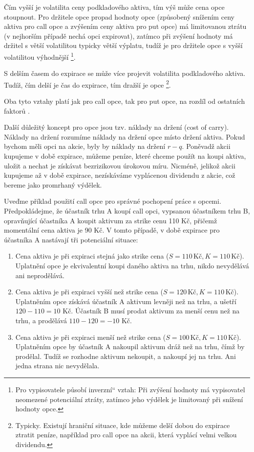 \documentclass[male,czech,api_bc]{kitheses}
\newcommand{\UV}[1]{\quotedblbase#1\textquotedblleft}
\begin{document}
  Čím vyšší je volatilita ceny podkladového aktiva, tím výš může cena opce stoupnout. Pro držitele opce propad hodnoty opce (způsobený snížením ceny aktiva pro call opce a zvýšením ceny aktiva pro put opce) má limitovanou ztrátu (v nejhorším případě nechá opci expirovat), zatímco při zvýšení hodnoty má držitel s větší volatilitou typicky větší výplatu, tudíž je pro držitele opce s vyšší volatilitou výhodnější \footnote{Pro vypisovatele působí \UV{inverzní} vztah: Při zvýšení hodnoty má vypisovatel neomezené potenciální ztráty, zatímco jeho výdělek je limitovaný při snížení hodnoty opce.}.

  S delším časem do expirace se může více projevit volatilita podkladového aktiva. Tudíž, čím delší je čas do expirace, tím dražší je opce \footnote{Typicky. Existují hraniční situace, kde můžeme delší dobou do expirace ztratit peníze, například pro call opce na akcii, která vyplácí velmi velkou dividendu.}.

  Oba tyto vztahy platí jak pro call opce, tak pro put opce, na rozdíl od ostatních faktorů \parencites[kapitola~11.1]{Hull2021}.

  \label{sec:cost_of_carry}
  Další důležitý koncept pro opce jsou tzv. náklady na držení (cost of carry). Náklady na držení rozumíme náklady na držení opce místo držení aktiva. Pokud bychom měli opci na akcie, byly by náklady na držení $r - q$. Poněvadž akcii kupujeme v době expirace, můžeme peníze, které chceme použít na koupi aktiva, uložit a nechat je získávat bezrizikovou úrokovou míru. Nicméně, jelikož akcii kupujeme až v době expirace, nezískáváme vyplácenou dividendu z akcie, což bereme jako promrhaný výdělek. 

  Uveďme příklad použití call opce pro správné pochopení práce s opcemi.
  Předpokládejme, že účastník trhu A koupí call opci, vypsanou účastníkem trhu B, opravňující účastníka A koupit aktivum za strike cenu 110 Kč, přičemž momentální cena aktiva je 90 Kč. V tomto případě, v době expirace pro účastníka A nastávají tři potenciální situace:
  \begin{enumerate}
    \item Cena aktiva je při expiraci stejná jako strike cena ($S = 110 \, \text{Kč}, K = 110 \, \text{Kč}$). Uplatnění opce je ekvivalentní koupi daného aktiva na trhu, nikdo nevydělává ani neprodělává.
    \item Cena aktiva je při expiraci vyšší než strike cena ($S = 120 \, \text{Kč}, K = 110 \, \text{Kč}$). Uplatněním opce získává účastník A aktivum levněji než na trhu, a ušetří $120 - 110 = 10$ Kč. Účastník B musí prodat aktivum za menší cenu než na trhu, a prodělává $110 - 120 = -10$ Kč.
    \item Cena aktiva je při expiraci menší než strike cena ($S = 100 \, \text{Kč}, K = 110 \, \text{Kč}$). Uplatněním opce by účastník A nakoupil aktivum dráž než na trhu, čímž by prodělal. Tudíž se rozhodne aktivum nekoupit, a nakoupí jej na trhu. Ani jedna strana nic nevydělala.
  \end{enumerate}
\end{document}
